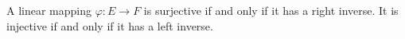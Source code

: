 A linear mapping $\varphi: E \to F$ is surjective if and only if it has a right inverse. It is injective if and only if it has a left inverse.
